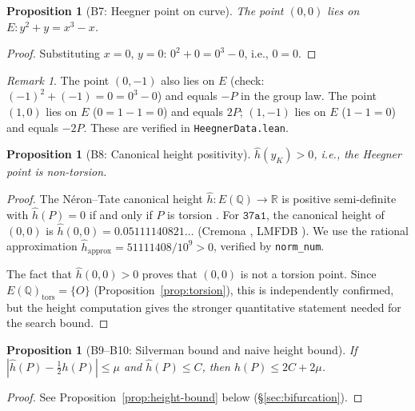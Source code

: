 \documentclass[11pt]{article}
\theoremstyle{plain}
\newtheorem{proposition}[theorem]{Proposition}
\theoremstyle{definition}
\theoremstyle{remark}
\newtheorem{remark}[theorem]{Remark}
\newcommand{\Q}{\mathbb{Q}}
\newcommand{\R}{\mathbb{R}}
\newcommand{\hhat}{\hat{h}}
\begin{document}
\begin{proposition}[B7: Heegner point on curve]\label{prop:heegner-pt}
The point $(0, 0)$ lies on $E: y^2 + y = x^3 - x$.
\end{proposition}

\begin{proof}
Substituting $x = 0$, $y = 0$: $0^2 + 0 = 0^3 - 0$, i.e., $0 = 0$. \checkmark
\end{proof}

\begin{remark}
The point $(0, -1)$ also lies on $E$ (check: $(-1)^2 + (-1) = 0 = 0^3 - 0$) and equals $-P$ in the group law. The point $(1, 0)$ lies on $E$ ($0 = 1 - 1 = 0$) and equals $2P$; $(1, -1)$ lies on $E$ ($1 - 1 = 0$) and equals $-2P$. These are verified in \texttt{HeegnerData.lean}.
\end{remark}

\begin{proposition}[B8: Canonical height positivity]\label{prop:height-pos}
$\hhat(y_K) > 0$, i.e., the Heegner point is non-torsion.
\end{proposition}

\begin{proof}
The N\'eron--Tate canonical height $\hhat: E(\Q) \to \R$ is positive semi-definite with $\hhat(P) = 0$ if and only if $P$ is torsion \cite{silverman-aec}. For $\texttt{37a1}$, the canonical height of $(0,0)$ is $\hhat(0,0) = 0.05111140821\ldots$ (Cremona \cite{cremona}, LMFDB \cite{lmfdb}). We use the rational approximation $\hhat_{\mathrm{approx}} = 51111408/10^9 > 0$, verified by \texttt{norm\_num}.

The fact that $\hhat(0,0) > 0$ proves that $(0, 0)$ is not a torsion point. Since $E(\Q)_{\mathrm{tors}} = \{O\}$ (Proposition~\ref{prop:torsion}), this is independently confirmed, but the height computation gives the stronger quantitative statement needed for the search bound.
\end{proof}

\begin{proposition}[B9--B10: Silverman bound and naive height bound]\label{prop:silverman}
If $|\hhat(P) - \tfrac{1}{2}h(P)| \leq \mu$ and $\hhat(P) \leq C$, then $h(P) \leq 2C + 2\mu$.
\end{proposition}

\begin{proof}
See Proposition~\ref{prop:height-bound} below (\S\ref{sec:bifurcation}).
\end{proof}
\end{document}
